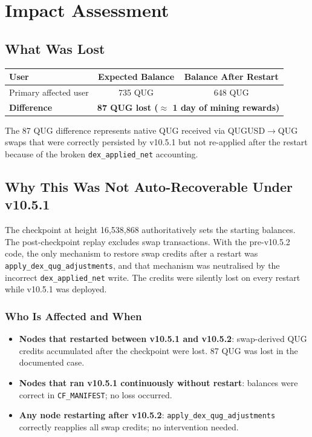 \documentclass[11pt,a4paper]{article}
\begin{document}
\section{Impact Assessment}

\subsection{What Was Lost}

\begin{center}
\begin{tabular}{lcc}
\toprule
\textbf{User} & \textbf{Expected Balance} & \textbf{Balance After Restart} \\
\midrule
Primary affected user & 735 QUG & 648 QUG \\
\textbf{Difference} & \multicolumn{2}{c}{\textbf{87 QUG lost ($\approx$ 1 day of mining rewards)}} \\
\bottomrule
\end{tabular}
\end{center}

The 87 QUG difference represents native QUG received via QUGUSD$\to$QUG swaps
that were correctly persisted by v10.5.1 but not re-applied after the restart
because of the broken \texttt{dex\_applied\_net} accounting.

\subsection{Why This Was Not Auto-Recoverable Under v10.5.1}

The checkpoint at height 16,538,868 authoritatively sets the starting balances.
The post-checkpoint replay excludes swap transactions.  With the pre-v10.5.2
code, the only mechanism to restore swap credits after a restart was
\texttt{apply\_dex\_qug\_adjustments}, and that mechanism was neutralised by the
incorrect \texttt{dex\_applied\_net} write.  The credits were silently lost on
every restart while v10.5.1 was deployed.

\subsubsection*{Who Is Affected and When}

\begin{itemize}
  \item \textbf{Nodes that restarted between v10.5.1 and v10.5.2}: swap-derived
        QUG credits accumulated after the checkpoint were lost.  87 QUG was lost
        in the documented case.
  \item \textbf{Nodes that ran v10.5.1 continuously without restart}: balances
        were correct in \texttt{CF\_MANIFEST}; no loss occurred.
  \item \textbf{Any node restarting after v10.5.2}: \texttt{apply\_dex\_qug\_adjustments}
        correctly reapplies all swap credits; no intervention needed.
\end{itemize}
\end{document}

